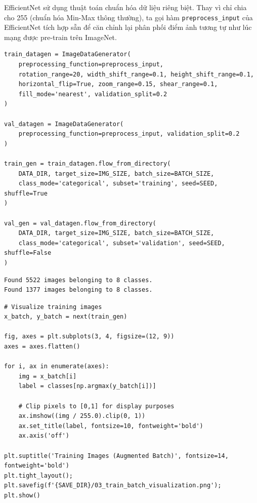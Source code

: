 EfficientNet sử dụng thuật toán chuẩn hóa dữ liệu riêng biệt. Thay vì chỉ chia cho 255 (chuẩn hóa Min-Max thông thường), ta gọi hàm \texttt{preprocess\_input} của EfficientNet tích hợp sẵn để căn chỉnh lại phân phối điểm ảnh tương tự như lúc mạng được pre-train trên ImageNet.

\begin{lstlisting}[style=pythoncode, caption={Sử dụng Generator với kỹ thuật biến đổi ảnh đa dạng}]
train_datagen = ImageDataGenerator(
    preprocessing_function=preprocess_input,
    rotation_range=20, width_shift_range=0.1, height_shift_range=0.1,
    horizontal_flip=True, zoom_range=0.15, shear_range=0.1,
    fill_mode='nearest', validation_split=0.2
)

val_datagen = ImageDataGenerator(
    preprocessing_function=preprocess_input, validation_split=0.2
)

train_gen = train_datagen.flow_from_directory(
    DATA_DIR, target_size=IMG_SIZE, batch_size=BATCH_SIZE,
    class_mode='categorical', subset='training', seed=SEED, shuffle=True
)

val_gen = val_datagen.flow_from_directory(
    DATA_DIR, target_size=IMG_SIZE, batch_size=BATCH_SIZE,
    class_mode='categorical', subset='validation', seed=SEED, shuffle=False
)
\end{lstlisting}

\begin{lstlisting}[style=consoleoutput, caption={Output: Tổng quan Dataset Split}]
Found 5522 images belonging to 8 classes.
Found 1377 images belonging to 8 classes.
\end{lstlisting}

\begin{lstlisting}[style=pythoncode, caption={Trực quan hóa một mẻ ảnh (Batch) đã qua tiền xử lý}]
# Visualize training images
x_batch, y_batch = next(train_gen)

fig, axes = plt.subplots(3, 4, figsize=(12, 9))
axes = axes.flatten()

for i, ax in enumerate(axes):
    img = x_batch[i]
    label = classes[np.argmax(y_batch[i])]
    
    # Clip pixels to [0,1] for display purposes
    ax.imshow((img / 255.0).clip(0, 1))
    ax.set_title(label, fontsize=10, fontweight='bold')
    ax.axis('off')

plt.suptitle('Training Images (Augmented Batch)', fontsize=14, fontweight='bold')
plt.tight_layout(); plt.savefig(f'{SAVE_DIR}/03_train_batch_visualization.png'); plt.show()
\end{lstlisting}

